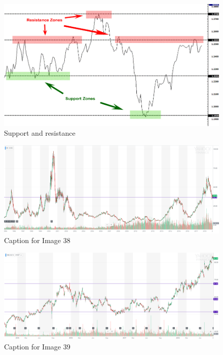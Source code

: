 \documentclass{article}
\begin{document}
\vspace{10pt}

\begin{figure}[!htb]
    \centering
    \includegraphics[width=\textwidth]{imgs/37.png}
    \caption{Support and resistance}
\end{figure}

\vspace{10pt}

\begin{figure}[!htb]
    \centering
    \includegraphics[width=\textwidth]{imgs/38.png}
    \caption{Caption for Image 38}
\end{figure}

\vspace{10pt}

\begin{figure}[!htb]
    \centering
    \includegraphics[width=\textwidth]{imgs/39.png}
    \caption{Caption for Image 39}
\end{figure}
\end{document}
